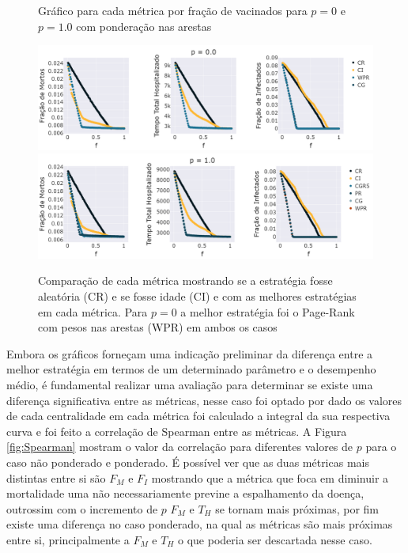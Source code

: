 \begin{figure}[H]
    \centering
    \captionsetup{font=normalsize,skip=0.8pt,singlelinecheck=on,labelsep=endash}
    \caption{Gráfico para cada métrica por fração de vacinados para $p = 0$ e $p = 1.0$ com ponderação nas arestas}
    \includegraphics[scale= 0.3]{figuras/compara_p_f_ponderado_0.0.png}
    \includegraphics[scale= 0.3]{figuras/compara_p_f_ponderado_1.0.png}

    \captionsetup{font=small,justification=justified}
    
    \caption*{ Comparação de cada métrica mostrando se a estratégia fosse aleatória (CR) e se fosse idade (CI) e com as melhores estratégias em cada métrica. Para $p = 0$ a melhor estratégia foi o Page-Rank com pesos nas arestas (WPR) em ambos os casos }
    \label{fig:resultados_metricas_ponderado}
\end{figure}

Embora os gráficos forneçam uma indicação preliminar da diferença entre a melhor estratégia em termos de um determinado parâmetro e o desempenho médio, é fundamental realizar uma avaliação para determinar se existe uma diferença significativa entre as métricas, nesse caso foi optado por dado os valores de cada centralidade em cada métrica foi calculado a integral da sua respectiva curva e foi feito a correlação de Spearman entre as métricas. A Figura \ref{fig:Spearman} mostram o valor da correlação para diferentes valores de $p$ para o caso não ponderado e ponderado. É possível ver que as duas métricas mais distintas entre si são $F_M$ e $F_I$ mostrando que a métrica que foca em diminuir a mortalidade uma não necessariamente previne a espalhamento da doença, outrossim com o incremento de $p$ $F_M$ e $T_H$ se tornam mais próximas, por fim existe uma diferença no caso ponderado, na qual as métricas são mais próximas entre si, principalmente a $F_M$ e $T_H$ o que poderia ser descartada nesse caso.

